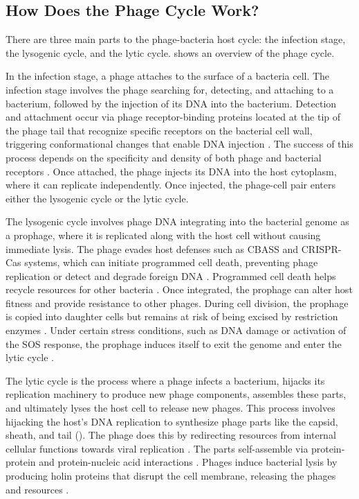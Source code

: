\subsection{How Does the Phage Cycle Work?}
There are three main parts to the phage-bacteria host cycle: the infection stage, the lysogenic cycle, and the lytic cycle. 
 shows an overview of the phage cycle. 

In the infection stage, a phage attaches to the surface of a bacteria cell. 
The infection stage involves the phage searching for, detecting, and attaching to a bacterium, followed by the injection of its DNA into the bacterium. 
Detection and attachment occur via phage receptor-binding proteins located at the tip of the phage tail that recognize specific receptors on the bacterial cell wall, triggering conformational changes that enable DNA injection \cite{lindbergBacteriophageReceptors1973}. 
The success of this process depends on the specificity and density of both phage and bacterial receptors \cite{stoneUnderstandingExploitingPhage2019}. 
Once attached, the phage injects its DNA into the host cytoplasm, where it can replicate independently.
Once injected, the phage-cell pair enters either the lysogenic cycle or the lytic cycle. 

The lysogenic cycle involves phage DNA integrating into the bacterial genome as a prophage, where it is replicated along with the host cell without causing immediate lysis.
The phage evades host defenses such as CBASS and CRISPR-Cas systems, which can initiate programmed cell death, preventing phage replication or detect and degrade foreign DNA \cite{banhBacterialCGASSenses2023, levyCRISPRAdaptationBiases2015}. 
Programmed cell death helps recycle resources for other bacteria \cite{warwick-dugdaleHosthijackingPlanktonicPiracy2019}. 
Once integrated, the prophage can alter host fitness and provide resistance to other phages. 
During cell division, the prophage is copied into daughter cells but remains at risk of being excised by restriction enzymes \cite{sharpMolecularEvolutionBacteriophages1986}.
Under certain stress conditions, such as DNA damage or activation of the SOS response, the prophage induces itself to exit the genome and enter the lytic cycle \cite{waldorPhageRegulatoryCircuits2005, stoneUnderstandingExploitingPhage2019, fortierImportanceProphagesEvolution2013}.

The lytic cycle is the process where a phage infects a bacterium, hijacks its replication machinery to produce new phage components, assembles these parts, and ultimately lyses the host cell to release new phages. 
This process involves hijacking the host’s DNA replication to synthesize phage parts like the capsid, sheath, and tail (). 
The phage does this by redirecting resources from internal cellular functions towards viral replication \cite{warwick-dugdaleHosthijackingPlanktonicPiracy2019}. 
The parts self-assemble via protein-protein and protein-nucleic acid interactions \cite{aksyukBacteriophageAssembly2011}. 
Phages induce bacterial lysis by producing holin proteins that disrupt the cell membrane, releasing the phages and resources \cite{wangHolinsProteinClocks2000}.

